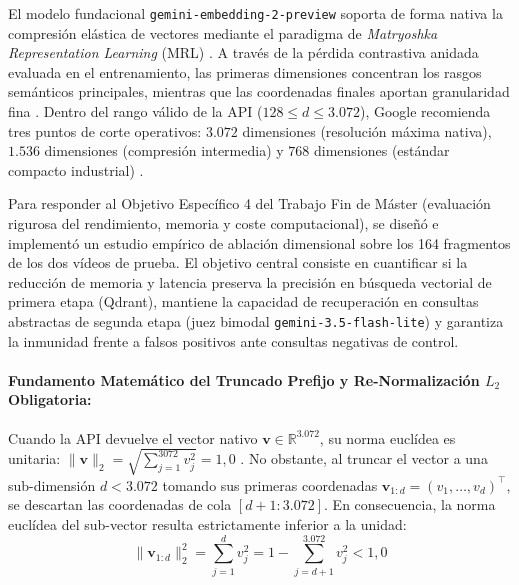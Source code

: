El modelo fundacional \texttt{gemini-embedding-2-preview} soporta de forma nativa la compresión elástica de vectores mediante el paradigma de \textit{Matryoshka Representation Learning} (MRL) \cite{kusupati2022matryoshka, gemini_emb2_docs}. A través de la pérdida contrastiva anidada evaluada en el entrenamiento, las primeras dimensiones concentran los rasgos semánticos principales, mientras que las coordenadas finales aportan granularidad fina \cite{kusupati2022matryoshka}. Dentro del rango válido de la API ($128 \le d \le 3.072$), Google recomienda tres puntos de corte operativos: $3.072$ dimensiones (resolución máxima nativa), $1.536$ dimensiones (compresión intermedia) y $768$ dimensiones (estándar compacto industrial) \cite{gemini_emb2_docs}.

Para responder al Objetivo Específico 4 del Trabajo Fin de Máster (evaluación rigurosa del rendimiento, memoria y coste computacional), se diseñó e implementó un estudio empírico de ablación dimensional sobre los 164 fragmentos de los dos vídeos de prueba. El objetivo central consiste en cuantificar si la reducción de memoria y latencia preserva la precisión en búsqueda vectorial de primera etapa (Qdrant), mantiene la capacidad de recuperación en consultas abstractas de segunda etapa (juez bimodal \texttt{gemini-3.5-flash-lite}) y garantiza la inmunidad frente a falsos positivos ante consultas negativas de control.

\paragraph{Fundamento Matemático del Truncado Prefijo y Re-Normalización $L_2$ Obligatoria:}
Cuando la API devuelve el vector nativo $\mathbf{v} \in \mathbb{R}^{3.072}$, su norma euclídea es unitaria: $\|\mathbf{v}\|_2 = \sqrt{\sum_{j=1}^{3072} v_j^2} = 1,0$ \cite{gemini_emb2_docs}. No obstante, al truncar el vector a una sub-dimensión $d < 3.072$ tomando sus primeras coordenadas $\mathbf{v}_{1:d} = (v_1, \dots, v_d)^\top$, se descartan las coordenadas de cola $[d+1 : 3.072]$. En consecuencia, la norma euclídea del sub-vector resulta estrictamente inferior a la unidad:
\begin{equation}
\|\mathbf{v}_{1:d}\|_2^2 = \sum_{j=1}^{d} v_j^2 = 1 - \sum_{j=d+1}^{3.072} v_j^2 < 1,0
\label{eq:perdida_norma_mrl}
\end{equation}

